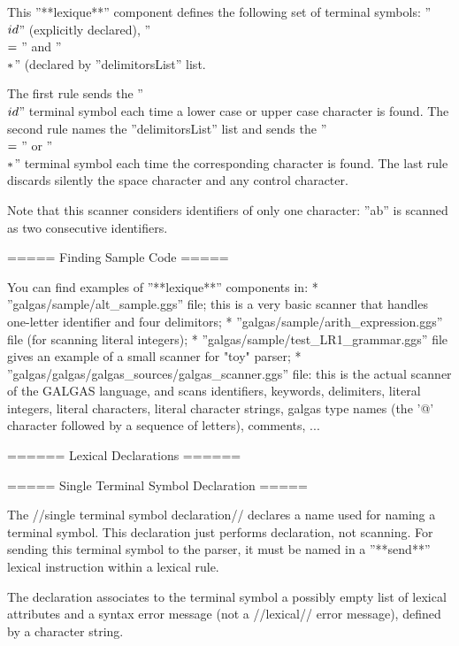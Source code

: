 This ''**lexique**'' component defines the following set of terminal symbols: ''\\$id\\$'' (explicitly declared), ''\\$=\\$'' and ''\\$*\\$'' (declared  by ''delimitorsList'' list.

The first rule sends the ''\\$id\\$'' terminal symbol each time a lower case or upper case character is found. The second rule names the ''delimitorsList'' list and sends the ''\\$=\\$'' or ''\\$*\\$'' terminal symbol each time the corresponding character is found. The last rule discards silently the space character and any control character.

Note that this scanner considers identifiers of only one character: ''ab'' is scanned as two consecutive identifiers.

===== Finding Sample Code =====

You can find examples of ''**lexique**'' components in:
  * ''galgas/sample/alt\_sample.ggs'' file; this is a very basic scanner that handles one-letter identifier and four delimitors;
  * ''galgas/sample/arith\_expression.ggs'' file (for scanning literal integers); 
  * ''galgas/sample/test\_LR1\_grammar.ggs'' file gives an example of a small scanner for "toy" parser;
  * ''galgas/galgas/galgas\_sources/galgas\_scanner.ggs'' file: this is the actual scanner of the GALGAS language, and scans identifiers, keywords, delimiters, literal integers, literal characters, literal character strings, galgas type names (the '@' character followed by a sequence of letters), comments, ...   

====== Lexical Declarations ======

===== Single Terminal Symbol Declaration =====

The //single terminal symbol declaration// declares a name used for naming a terminal symbol. This declaration just performs declaration, not scanning. For sending this terminal symbol to the parser, it must be named in a ''**send**'' lexical instruction within a lexical rule.

The declaration associates to the terminal symbol a possibly empty list of lexical attributes and a syntax error message (not a //lexical// error message), defined by a character string.

